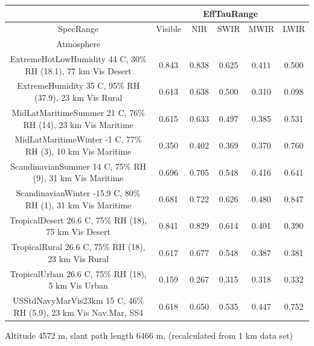 \documentclass{workpackage}
\begin{document}
\begin{center}

\begin{footnotesize}

\begin{tabular}{|c|c|c|c|c|c|}
\hline
&\multicolumn{5}{|c|}{EffTauRange}\\\hline
SpecRange&Visible&NIR&SWIR&MWIR&LWIR\\\hline
Atmosphere&&&&&\\\hline
ExtremeHotLowHumidity 44 C, 30\% RH (18.1), 77 km Vis Desert&0.843&0.838&0.625&0.411&0.500\\\hline
ExtremeHumidity 35 C, 95\% RH (37.9), 23 km Vis Rural&0.613&0.638&0.500&0.310&0.098\\\hline
MidLatMaritimeSummer 21 C, 76\% RH (14), 23 km Vis Maritime&0.615&0.633&0.497&0.385&0.531\\\hline
MidLatMaritimeWinter -1 C, 77\% RH (3), 10 km Vis Maritime&0.350&0.402&0.369&0.370&0.760\\\hline
ScandinavianSummer 14 C, 75\% RH (9), 31 km Vis Maritime&0.696&0.705&0.548&0.416&0.641\\\hline
ScandinavianWinter -15.9 C, 80\% RH (1), 31 km Vis Maritime&0.681&0.722&0.626&0.480&0.847\\\hline
TropicalDesert 26.6 C, 75\% RH (18), 75 km Vis Desert&0.841&0.829&0.614&0.401&0.390\\\hline
TropicalRural 26.6 C, 75\% RH (18), 23 km Vis Rural&0.617&0.677&0.548&0.387&0.381\\\hline
TropicalUrban 26.6 C, 75\% RH (18), 5 km Vis Urban&0.159&0.267&0.315&0.318&0.332\\\hline
USStdNavyMarVis23km 15 C, 46\% RH (5.9), 23 km Vis Nav.Mar, SS4&0.618&0.650&0.535&0.447&0.752\\\hline

\end{tabular}
\end{footnotesize}
\end{center}



Altitude 4572 m, slant path length 6466 m, (recalculated from 1 km data set)
\end{document}

